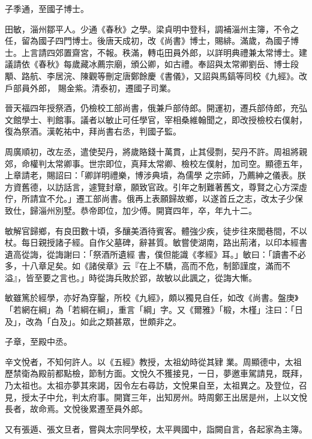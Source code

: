 \begin{pinyinscope}
 子季通，至國子博士。



 田敏，淄州鄒平人。少通《春秋》之學。梁貞明中登科，調補淄州主簿，不令之任，留為國子四門博士。後唐天成初，改《尚書》博士，賜緋。滿歲，為國子博士。上言請四郊置齋宮，不報。秩滿，轉屯田員外郎，以詳明典禮兼太常博士。建議請依《春秋》每歲藏冰薦宗廟，頒公卿，如古禮。奉詔與太常卿劉岳、博士段顒、路航、李居浣、陳觀等刪定唐鄭餘慶《書儀》，又詔與馬鎬等同校《九經》。改戶部員外郎，
 賜金紫。清泰初，遷國子司業。



 晉天福四年授祭酒，仍檢校工部尚書，俄兼戶部侍郎。開運初，遷兵部侍郎，充弘文館學士、判館事。議者以敏止可任學官，宰相桑維翰聞之，即改授檢校右僕射，復為祭酒。漢乾祐中，拜尚書右丞，判國子監。



 周廣順初，改左丞，遣使契丹，將歲賂錢十萬貫，止其侵剽，契丹不許。周祖將親郊，命權判太常卿事。世宗即位，真拜太常卿、檢校左僕射，加司空。顯德五年，上章請老，賜詔曰：「卿詳明禮樂，博涉典墳，為儒學
 之宗師，乃薦紳之儀表。朕方資舊德，以訪話言，遽覽封章，願致官政。引年之制難著舊文，尊賢之心方深虛佇，所請宜不允。」遷工部尚書。俄再上表願歸故鄉，以遂首丘之志，改太子少保致仕，歸淄州別墅。恭帝即位，加少傅。開寶四年，卒，年九十二。



 敏解官歸鄉，有良田數十頃，多釀美酒待賓客。體強少疾，徒步往來閭巷間，不以杖。每日親授諸子經。自作父墓碑，辭甚質。敏嘗使湖南，路出荊渚，以印本經書遺高從誨，從誨謝曰：「祭酒所遺經
 書，僕但能識《孝經》耳。」敏曰：「讀書不必多，十八章足矣。如《諸侯章》云『在上不驕，高而不危，制節謹度，滿而不溢』，皆至要之言也。」時從誨兵敗於郢，故敏以此諷之，從誨大慚。



 敏雖篤於經學，亦好為穿鑿，所校《九經》，頗以獨見自任，如改《尚書。盤庚》「若網在綱」為「若綱在綱」，重言「綱」字。又《爾雅》「椴，木槿」注曰：「日及」，改為「白及」。如此之類甚眾，世頗非之。



 子章，至殿中丞。



 辛文悅者，不知何許人。以《五經》教授，太祖幼時從其肄
 業。周顯德中，太祖歷禁衛為殿前都點檢，節制方面。文悅久不獲接見，一日，夢邀車駕請見，既拜，乃太祖也。太祖亦夢其來謁，因令左右尋訪，文悅果自至，太祖異之。及登位，召見，授太子中允，判太府事。開寶三年，出知房州。時周鄭王出居是州，上以文悅長者，故命焉。文悅後累遷至員外郎。



 又有張遁、張文旦者，嘗與太宗同學校，太平興國中，詣闕自言，各起家為主簿。




\end{pinyinscope}
